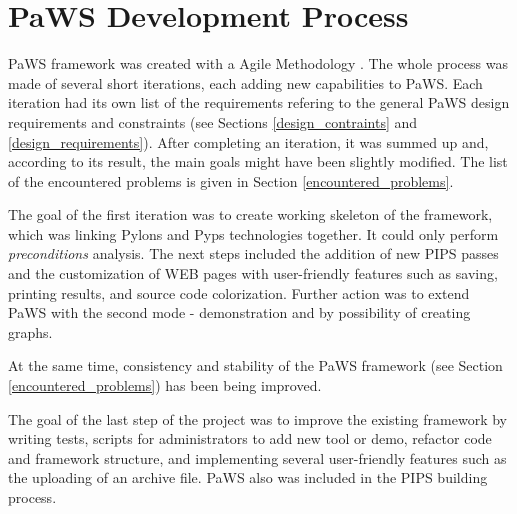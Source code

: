 \section{PaWS Development Process}

PaWS framework was created with a Agile Methodology
\cite{agilemethodology}. The whole process was made of several short iterations,
each adding new capabilities to PaWS. Each iteration had its
own list of the requirements refering to the general PaWS design
requirements and constraints (see Sections \ref{design_contraints} and
\ref{design_requirements}). After completing an iteration, it was
summed up and, according to its result, the main goals might have been
slightly modified. The list of the encountered problems is given in Section
\ref{encountered_problems}.

The goal of the first iteration was to create working skeleton of the
framework, which was linking Pylons and Pyps technologies together. It
could only perform \emph{preconditions} analysis. The next steps
included the addition of
new PIPS passes and the customization of WEB pages with
user-friendly features such as saving, printing results, and source code
colorization. Further action was to extend PaWS with the second mode -
demonstration and by possibility of creating graphs.

At the same time, consistency and stability of the PaWS framework (see Section \ref{encountered_problems}) has been being improved.

The goal of the last step of the project was to improve the existing
framework by writing tests, scripts for administrators to add new tool
or demo, refactor code and framework structure, and implementing
several user-friendly features such as the uploading of an
archive file. PaWS also was included in the PIPS building process.




